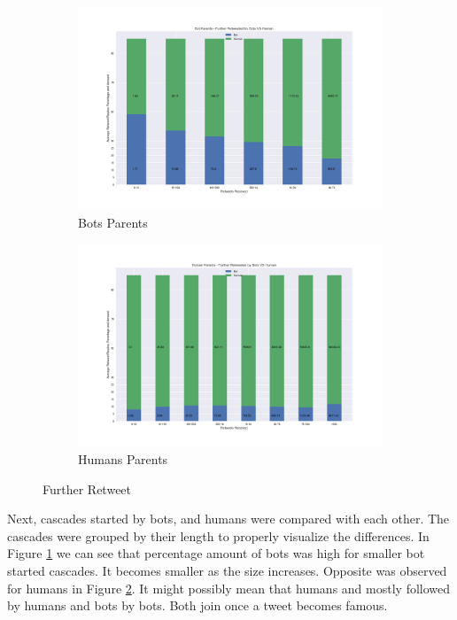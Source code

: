 \documentclass[letterpaper]{article}
\begin{document}
\begin{figure}
    \centering
    \begin{subfigure}[b]{1\linewidth}
      \includegraphics[width=\linewidth]{images/bots_furtherretweeted.png}
      \caption{Bots Parents}
      \label{fig:further_retweet_bots}
    \end{subfigure}
    \begin{subfigure}[b]{1\linewidth}
      \includegraphics[width=\linewidth]{images/humans_furtherretweeted.png}
      \caption{Humans Parents}
      \label{fig:further_retweet_humans}
    \end{subfigure}
    \caption{Further Retweet}
    \label{fig:further_retweet}
  \end{figure}

  Next, cascades started by bots, and humans were compared with each other. The cascades were grouped by their length to properly visualize the differences. 
  In Figure \ref{fig:further_retweet_bots} we can see that percentage amount of bots was high for smaller bot started cascades. It becomes smaller as the size increases. 
  Opposite was observed for humans in Figure \ref{fig:further_retweet_humans}. It might possibly mean that humans and mostly followed by humans and bots by bots. Both join once a tweet becomes famous.
\end{document}
